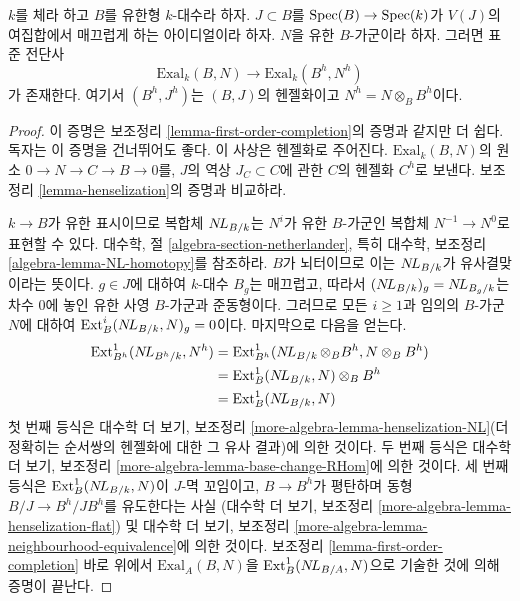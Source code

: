 \begin{lemma}
\label{lemma-first-order-henselization}
$k$를 체라 하고 $B$를 유한형 $k$-대수라 하자. $J \subset B$를
$\mathop{\mathrm{Spec}}(B) \to \mathop{\mathrm{Spec}}(k)$가 $V(J)$의 여집합에서 매끄럽게 하는 아이디얼이라
하자. $N$을 유한 $B$-가군이라 하자. 그러면 표준 전단사
$$
\text{Exal}_k(B, N) \to \text{Exal}_k(B^h, N^h)
$$
가 존재한다. 여기서 $(B^h, J^h)$는 $(B, J)$의 헨젤화이고
$N^h = N \otimes_B B^h$이다.
\end{lemma}

\begin{proof}
이 증명은 보조정리 \ref{lemma-first-order-completion}의 증명과 같지만
더 쉽다. 독자는 이 증명을 건너뛰어도 좋다. 이 사상은 헨젤화로 주어진다.
$\text{Exal}_k(B, N)$의 원소 $0 \to N \to C \to B \to 0$를,
$J$의 역상 $J_C \subset C$에 관한 $C$의 헨젤화 $C^h$로 보낸다.
보조정리 \ref{lemma-henselization}의 증명과 비교하라.

\medskip\noindent
$k \to B$가 유한 표시이므로 복합체 $\mathop{N\!L}\nolimits_{B/k}$는 $N^i$가 유한
$B$-가군인 복합체 $N^{-1} \to N^0$로 표현할 수 있다. 대수학, 절
\ref{algebra-section-netherlander}, 특히 대수학, 보조정리
\ref{algebra-lemma-NL-homotopy}를 참조하라. $B$가 뇌터이므로 이는
$\mathop{N\!L}\nolimits_{B/k}$가 유사결맞이라는 뜻이다. $g \in J$에 대하여 $k$-대수
$B_g$는 매끄럽고, 따라서 $(\mathop{N\!L}\nolimits_{B/k})_g = \mathop{N\!L}\nolimits_{B_g/k}$는 차수 $0$에
놓인 유한 사영 $B$-가군과 준동형이다.%
그러므로 모든 $i \geq 1$과 임의의 $B$-가군 $N$에 대하여
$\text{Ext}^i_B(\mathop{N\!L}\nolimits_{B/k}, N)_g = 0$이다. 마지막으로 다음을 얻는다.
\begin{align*}
\text{Ext}^1_{B^h}(\mathop{N\!L}\nolimits_{B^h/k}, N^h)
& =
\text{Ext}^1_{B^h}(\mathop{N\!L}\nolimits_{B/k} \otimes_B B^h, N \otimes_B B^h) \\
& =
\text{Ext}^1_B(\mathop{N\!L}\nolimits_{B/k}, N) \otimes_B B^h \\
& =
\text{Ext}^1_B(\mathop{N\!L}\nolimits_{B/k}, N)
\end{align*}
첫 번째 등식은 대수학 더 보기, 보조정리
\ref{more-algebra-lemma-henselization-NL}(더 정확히는 순서쌍의 헨젤화에
대한 그 유사 결과)에 의한 것이다. 두 번째 등식은 대수학 더 보기,
보조정리 \ref{more-algebra-lemma-base-change-RHom}에 의한 것이다.
세 번째 등식은 $\text{Ext}^1_B(\mathop{N\!L}\nolimits_{B/k}, N)$이 $J$-멱 꼬임이고,
$B \to B^h$가 평탄하며 동형 $B/J \to B^h/JB^h$를 유도한다는 사실
(대수학 더 보기, 보조정리
\ref{more-algebra-lemma-henselization-flat}) 및 대수학 더 보기, 보조정리
\ref{more-algebra-lemma-neighbourhood-equivalence}에 의한 것이다.
보조정리 \ref{lemma-first-order-completion} 바로 위에서
$\text{Exal}_A(B, N)$을 $\text{Ext}^1_B(\mathop{N\!L}\nolimits_{B/A}, N)$으로 기술한 것에
의해 증명이 끝난다.
\end{proof}

